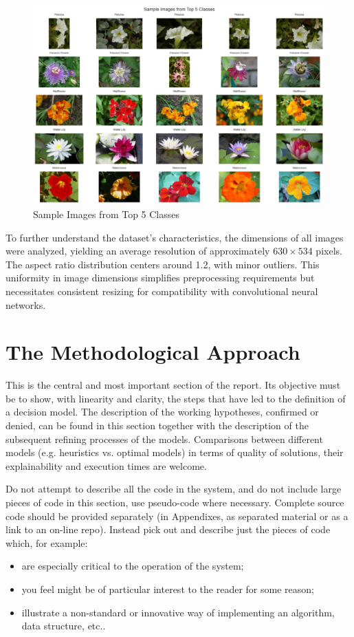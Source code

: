 \begin{figure}[h!]
    \centering
    \includegraphics[width=\linewidth]{Images/Sample Images from Top 5 Classes}
    \caption{Sample Images from Top 5 Classes}
\end{figure}

To further understand the dataset's characteristics, the dimensions of all images were analyzed, yielding an average
resolution of approximately \(630 \times 534\) pixels. The aspect ratio distribution centers around 1.2, with minor
outliers. This uniformity in image dimensions simplifies preprocessing requirements but necessitates consistent
resizing for compatibility with convolutional neural networks.

\section{The Methodological Approach}

This is the central and most important section of the report. Its objective must be to show, with linearity and clarity, the steps that have led to the definition of a decision model. The description of the working hypotheses, confirmed or denied, can be found in this section together with the description of the subsequent refining processes of the models. Comparisons between different models (e.g. heuristics vs. optimal models) in terms of quality of solutions, their explainability and execution times are welcome. 

Do not attempt to describe all the code in the system, and do not include large pieces of code in this section, use pseudo-code where necessary. Complete source code should be provided separately (in Appendixes, as separated material or as a link to an on-line repo). Instead pick out and describe just the pieces of code which, for example:
\begin{itemize}
\item are especially critical to the operation of the system;
\item you feel might be of particular interest to the reader for some reason;
\item  illustrate a non-standard or innovative way of implementing an algorithm, data
structure, etc..
\end{itemize}

